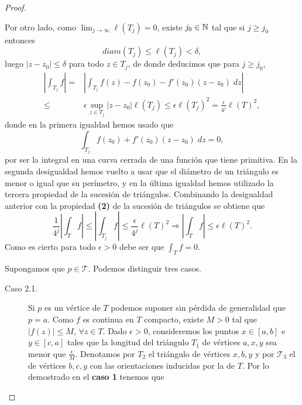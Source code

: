 \begin{proof}
\begin{description}
Por otro lado, como $\displaystyle \lim_{j \to \infty}\ell\left(T_{j}\right)=0 $, existe $\displaystyle j_{0} \in \mathbb{N} $ tal que si $\displaystyle j \geq j_{0} $ entonces
\[diam\left(T_{j}\right)\leq \ell\left(T_{j}\right)<\delta ,\]
luego $\displaystyle \left|z-z_{0}\right|\leq \delta  $ para todo $\displaystyle z \in T_{j} $, de donde deducimos que para $\displaystyle j \geq j_{0} $, 
\[
\begin{split}
	\left|\int _{T_{j}}f \right|= & \left|\int _{T_{j}}f\left(z\right)-f\left(z_{0}\right)-f'\left(z_{0}\right)\left(z-z_{0}\right) \; dz\right|\\
	\leq& \epsilon \sup_{z\in T_{j}} \left|z-z_{0}\right| \ell\left(T_{j}\right) \leq \epsilon \ell\left(T_{j}\right)^{2}=\frac{\epsilon }{4^{j}}\ell\left(T\right)^{2},
\end{split}
\]
donde en la primera igualdad hemos usado que 
\[\int _{T_{j}}f\left(z_{0}\right)+f'\left(z_{0}\right)\left(z-z_{0}\right) \; dz = 0 ,\]
por ser la integral en una curva cerrada de una función que tiene primitiva. En la segunda desigualdad hemos vuelto a usar que el diámetro de un triángulo es menor o igual que su perímetro, y en la última igualdad hemos utilizado la tercera propiedad de la sucesión de triángulos. Combinando la desigualdad anterior con la propiedad \textbf{(2)} de la sucesión de triángulos se obtiene que 
\[ \frac{1}{4^{j}} \left|\int _{T}f \right|\leq \left|\int _{T_{j}}f \right|\leq \frac{\epsilon }{4^{j}}\ell\left(T\right)^{2} \Rightarrow \left|\int _{T}f \right|\leq \epsilon \ell\left(T\right)^{2} .\]
Como es cierto para todo $\displaystyle \epsilon > 0 $ debe ser que $\displaystyle \int _{T}f =0 $. 
\item[Caso 2.] Supongamos que $\displaystyle p \in \mathcal{T} $. Podemos distinguir tres casos. 
	\begin{description}
	\item[Caso 2.1.] Si $\displaystyle p $ es un vértice de $\displaystyle T $ podemos suponer sin pérdida de generalidad que $\displaystyle p = a $. Como $\displaystyle f $ es continua en $\displaystyle T $ compacto, existe $\displaystyle M > 0 $ tal que $\displaystyle \left|f\left(z\right)\right|\leq M $, $\displaystyle \forall z \in T $. 
		Dado $\displaystyle \epsilon > 0 $, consideremos los puntos $\displaystyle x \in \left[a,b\right]  $ e $\displaystyle y \in \left[c,a\right]  $ tales que la longitud del triángulo $\displaystyle T_{1} $ de vértices $\displaystyle a,x,y $ sea menor que $\displaystyle \frac{\epsilon }{M} $. 
		Denotamos por $\displaystyle T_{2} $ el triángulo de vértices $\displaystyle x,b,y $ y por $\displaystyle \mathcal{T}_{3} $ el de vértices $\displaystyle b,c,y $ con las orientaciones inducidas por la de $\displaystyle T $. Por lo demostrado en el \textbf{caso 1} tenemos que 

\end{description}
\end{description}
\end{proof}
